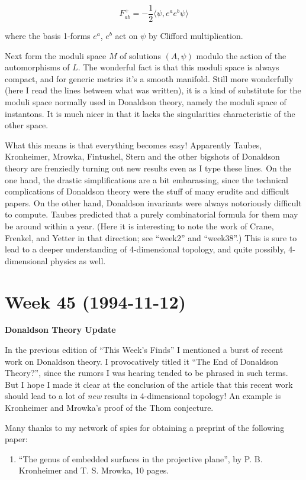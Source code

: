 \documentclass{article}
\def\tightlist{}
\begin{document}
\[F^+_{ab} = -\frac12 \langle\psi, e^a e^b \psi\rangle\]

where the basis 1-forms \(e^a\), \(e^b\) act on \(\psi\) by Clifford
multiplication.

Next form the moduli space \(M\) of solutions \((A, \psi)\) modulo the
action of the automorphisms of \(L\). The wonderful fact is that this
moduli space is always compact, and for generic metrics it's a smooth
manifold. Still more wonderfully (here I read the lines between what was
written), it is a kind of substitute for the moduli space normally used
in Donaldson theory, namely the moduli space of instantons. It is much
nicer in that it lacks the singularities characteristic of the other
space.

What this means is that everything becomes easy! Apparently Taubes,
Kronheimer, Mrowka, Fintushel, Stern and the other bigshots of Donaldson
theory are frenziedly turning out new results even as I type these
lines. On the one hand, the drastic simplifications are a bit
embarassing, since the technical complications of Donaldson theory were
the stuff of many erudite and difficult papers. On the other hand,
Donaldson invariants were always notoriously difficult to compute.
Taubes predicted that a purely combinatorial formula for them may be
around within a year. (Here it is interesting to note the work of Crane,
Frenkel, and Yetter in that direction; see ``week2'' and ``week38''.)
This is sure to lead to a deeper understanding of 4-dimensional
topology, and quite possibly, 4-dimensional physics as well.
\hypertarget{week-45-1994-11-12}{%
\section{Week 45 (1994-11-12)}\label{week-45-1994-11-12}}

\textbf{Donaldson Theory Update}

In the previous edition of ``This Week's Finds'' I mentioned a burst of
recent work on Donaldson theory. I provocatively titled it ``The End of
Donaldson Theory?'', since the rumors I was hearing tended to be phrased
in such terms. But I hope I made it clear at the conclusion of the
article that this recent work should lead to a lot of \emph{new} results
in 4-dimensional topology! An example is Kronheimer and Mrowka's proof
of the Thom conjecture.

Many thanks to my network of spies for obtaining a preprint of the
following paper:

\begin{enumerate}
\def\labelenumi{\arabic{enumi})}
\tightlist
\item
  ``The genus of embedded surfaces in the projective plane'', by P. B.
  Kronheimer and T. S. Mrowka, 10 pages.
\end{enumerate}
\end{document}
